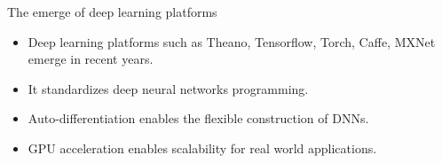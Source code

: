 \documentclass[14pt,aspectratio=1610]{beamer}
\begin{document}


\begin{frame}{The emerge of deep learning platforms}
\begin{itemize}
\item Deep learning platforms such as Theano, Tensorflow, Torch, Caffe, MXNet emerge in recent years.
\item It standardizes deep neural networks programming.
\item Auto-differentiation enables the flexible construction of DNNs.
\item GPU acceleration enables scalability for real world applications.
\end{itemize}
\end{frame}
\end{document}
